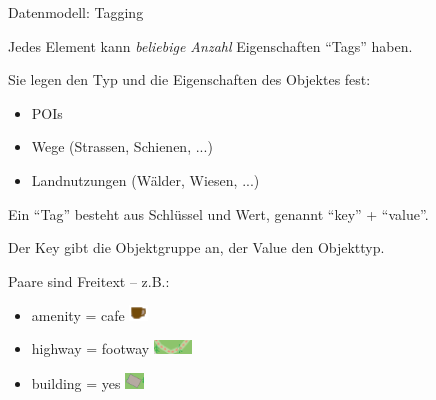 \documentclass{beamer}
\begin{document}
\begin{frame}{Datenmodell: Tagging}

Jedes Element kann \emph{beliebige Anzahl} Eigenschaften "`Tags"' haben.

Sie legen den Typ und die Eigenschaften des Objektes fest:
\begin{itemize}
  \item POIs
  \item Wege (Strassen, Schienen, ...)
  \item Landnutzungen (Wälder, Wiesen, ...)
\end{itemize}

\pause

Ein "`Tag"' besteht aus Schlüssel und Wert, genannt "`key"' + "`value"'.

\pause

Der Key gibt die Objektgruppe an, der Value den Objekttyp.

 Paare sind Freitext -- z.B.:
\begin{itemize}
  \item amenity = cafe \includegraphics[width=0.5cm]{cafe.png}
  \item highway = footway \includegraphics[width=1cm]{footway.png}
  \item building = yes  \includegraphics[width=0.5cm]{building.png}
\end{itemize}

\end{frame}
\end{document}
